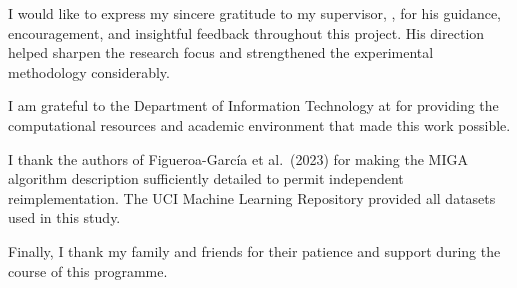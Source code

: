\begin{abstract}
\begin{spacing}{2}
The thesis delivers nine contributions: the first open-source reimplementation of MIGA; the first formal proof of $F_r$--RMSE orthogonality; the first MNAR evaluation of MIGA; the first controlled $p \times \rho$ characterisation; propensity-score-weighted IPW-$F_r$ (reduces $F_r$ by 1--38\% when $n/p \gtrsim 20$); AD-MIGA adaptive diversity injection; universal orthogonality via GAIN comparison and full $\alpha$-sweep; and near-linear parallel speedup (1.94--1.98$\times$ at Q=2) via \texttt{n\_jobs}.

\end{spacing}
\end{abstract}


\begin{acknowledgements}
\begin{spacing}{1.5}
\addchaptertocentry{\acknowledgementname} %

I would like to express my sincere gratitude to my supervisor, \supname, for his guidance, encouragement, and insightful feedback throughout this project. His direction helped sharpen the research focus and strengthened the experimental methodology considerably.

I am grateful to the Department of Information Technology at \univname{} for providing the computational resources and academic environment that made this work possible.

I thank the authors of Figueroa-Garc\'ia et al.\ (2023) for making the MIGA algorithm description sufficiently detailed to permit independent reimplementation. The UCI Machine Learning Repository provided all datasets used in this study.

Finally, I thank my family and friends for their patience and support during the course of this programme.

\end{spacing}
\end{acknowledgements}


\tableofcontents %

